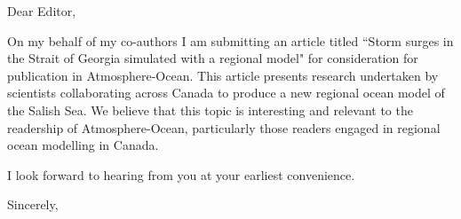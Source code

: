 \documentclass{letter}
\begin{document}
\begin{letter}{}

\opening{Dear Editor,}

On my behalf of my co-authors I am submitting an article titled ``Storm surges in the Strait of Georgia simulated with a regional model" for consideration for publication in Atmosphere-Ocean. This article presents research undertaken by scientists collaborating across Canada to produce a new regional ocean model of the Salish Sea.  We believe that this topic is interesting and relevant to the readership of Atmosphere-Ocean, particularly those readers engaged in regional ocean modelling in Canada.

I look forward to hearing from you at your earliest convenience. 

\closing{Sincerely,}
\end{letter}
\end{document}
